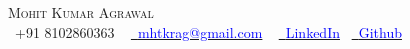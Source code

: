 \documentclass[letterpaper,11pt]{article}
\begin{document}

\begin{center}
{\Huge \scshape Mohit Kumar Agrawal} \\ \vspace{0pt}
\small \raisebox{-0.1\height}\faPhone\ +91 8102860363 ~
\href{mailto:mhtkrag@gmail.com}{\raisebox{-0.2\height}\faEnvelope\ \textcolor{blue}
{mhtkrag@gmail.com}} ~
\href{https://www.linkedin.com/in/mohit-agrawal-02183b23a/}{\raisebox{-0.2\height}\faLinkedin\
\textcolor{blue}{LinkedIn}}~
\href{https://github.com/mohitkumaragrawal}{\raisebox{-0.2\height}\faGithub\ \textcolor{blue}
{Github}}
\end{center}
\vspace{-20pt}
\end{document}
